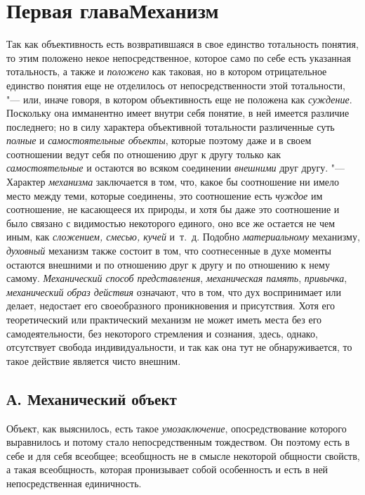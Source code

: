 \chapter[Первая глава Механизм]{Первая глава\newline Механизм}
Так как объективность есть возвратившаяся в свое единство
тотальность понятия, то этим положено некое непосредственное, которое само
по себе есть указанная тотальность, а также и {\em положено} как
таковая, но в котором отрицательное единство понятия еще не отделилось от
непосредственности этой тотальности, "--- или, иначе говоря, в
котором объективность еще не положена как {\em суждение}. Поскольку
она имманентно имеет внутри себя понятие, в ней имеется различие
последнего; но в силу характера объективной тотальности различенные суть
{\em полные} и {\em самостоятельные объекты},
которые поэтому даже и в своем соотношении ведут себя по
отношению друг к другу только как {\em самостоятельные} и
остаются во всяком соединении {\em внешними} друг другу. "--- Характер
{\em механизма} заключается в том, что, какое бы соотношение ни имело место
между теми, которые соединены, это соотношение есть {\em чуждое} им
соотношение, не касающееся их природы, и хотя бы даже это соотношение и
было связано с видимостью некоторого единого, оно все же остается не чем
иным, как {\em сложением, смесью, кучей} и~т.~д. Подобно {\em материальному}
механизму, {\em духовный}
механизм также состоит в том, что соотнесенные в духе моменты
остаются внешними и по отношению друг к другу и по отношению к нему самому.
{\em Механический способ представления}, {\em механическая
память}, {\em привычка}, {\em механический образ действия} означают, что в
том, что дух воспринимает или делает, недостает его
своеобразного проникновения и присутствия. Хотя его
теоретический или практический механизм не может иметь места без его
самодеятельности, без некоторого стремления и сознания, здесь, однако,
отсутствует свобода индивидуальности, и так как она тут не обнаруживается,
то такое действие является чисто внешним.

\section[А. Механический объект]{А. Механический объект}
Объект, как выяснилось, есть такое {\em умозаключение},
опосредствование которого выравнилось и потому стало непосредственным
тождеством. Он поэтому есть в себе и для себя всеобщее; всеобщность не в
смысле некоторой общности свойств, а такая всеобщность, которая пронизывает
собой особенность и есть в ней непосредственная единичность.

